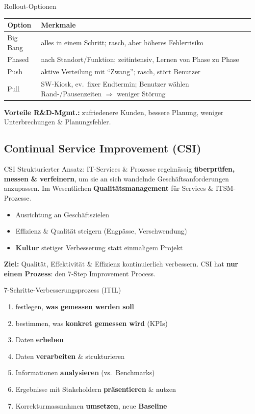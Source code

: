 \documentclass[a4paper, fontsize=7pt]{scrartcl}
\renewcommand*{\arraystretch}{1.5}  %
\begin{document}
\begin{mainbox}{Rollout-Optionen}
\renewcommand*{\arraystretch}{1.15}
\begin{tabularx}{\linewidth}{@{}l|>{\raggedright\arraybackslash}X@{}}
\textbf{Option} & \textbf{Merkmale} \\
\hline
Big Bang & alles in einem Schritt; rasch, aber höheres Fehlerrisiko \\
Phased & nach Standort/Funktion; zeitintensiv, Lernen von Phase zu Phase \\
Push & aktive Verteilung mit ``Zwang''; rasch, stört Benutzer \\
Pull & SW-Kiosk, ev.\ fixer Endtermin; Benutzer wählen Rand-/Pausenzeiten
  $\Rightarrow$ weniger Störung \\
\end{tabularx}
\textbf{Vorteile R\&D-Mgmt.:} zufriedenere Kunden, bessere Planung, weniger
Unterbrechungen \& Planungsfehler.
\end{mainbox}

\subsection{Continual Service Improvement (CSI)}

\begin{mainbox}{CSI}
Strukturierter Ansatz: IT-Services \& Prozesse regelmässig
\textbf{überprüfen, messen \& verfeinern}, um sie an sich wandelnde
Geschäftsanforderungen anzupassen. Im Wesentlichen
\textbf{Qualitätsmanagement} für Services \& ITSM-Prozesse.
\begin{itemize}
    \item Ausrichtung an Geschäftszielen
    \item Effizienz \& Qualität steigern (Engpässe, Verschwendung)
    \item \textbf{Kultur} stetiger Verbesserung statt einmaligem Projekt
\end{itemize}
\textbf{Ziel:} Qualität, Effektivität \& Effizienz kontinuierlich verbessern.
CSI hat \textbf{nur einen Prozess}: den 7-Step Improvement Process.
\end{mainbox}

\begin{mainbox}{7-Schritte-Verbesserungsprozess (ITIL)}
\begin{enumerate}
    \item festlegen, \textbf{was gemessen werden soll}
    \item bestimmen, was \textbf{konkret gemessen wird} (KPIs)
    \item Daten \textbf{erheben}
    \item Daten \textbf{verarbeiten} \& strukturieren
    \item Informationen \textbf{analysieren} (vs.\ Benchmarks)
    \item Ergebnisse mit Stakeholdern \textbf{präsentieren} \& nutzen
    \item Korrekturmassnahmen \textbf{umsetzen}, neue \textbf{Baseline}
\end{enumerate}
\end{mainbox}
\end{document}
